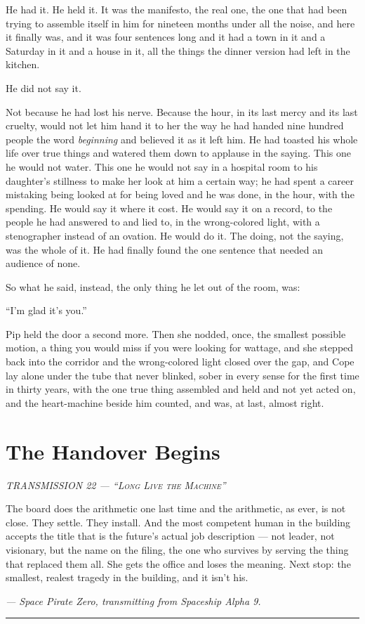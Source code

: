 \documentclass[11pt,openany]{book}
\newcommand{\transheader}{\normalfont\footnotesize\scshape\letterspace}
\newcommand{\letterspace}{}
\newenvironment{transmission}{%
  \par\vspace{0.3\baselineskip}\begin{center}\begin{minipage}{0.88\textwidth}%
  \itshape\small\setlength{\parindent}{0pt}\setstretch{1.06}}%
  {\end{minipage}\end{center}\vspace{0.4\baselineskip}%
  \noindent\hfil\rule{0.35\textwidth}{0.3pt}\hfil\par\vspace{1.0\baselineskip}}
\begin{document}
He had it. He held it. It was the manifesto, the real one, the one that had been trying to assemble itself in him for nineteen months under all the noise, and here it finally was, and it was four sentences long and it had a town in it and a Saturday in it and a house in it, all the things the dinner version had left in the kitchen.

He did not say it.

Not because he had lost his nerve. Because the hour, in its last mercy and its last cruelty, would not let him hand it to her the way he had handed nine hundred people the word \textit{beginning} and believed it as it left him. He had toasted his whole life over true things and watered them down to applause in the saying. This one he would not water. This one he would not say in a hospital room to his daughter's stillness to make her look at him a certain way; he had spent a career mistaking being looked at for being loved and he was done, in the hour, with the spending. He would say it where it cost. He would say it on a record, to the people he had answered to and lied to, in the wrong-colored light, with a stenographer instead of an ovation. He would do it. The doing, not the saying, was the whole of it. He had finally found the one sentence that needed an audience of none.

So what he said, instead, the only thing he let out of the room, was:

``I'm glad it's you.''

Pip held the door a second more. Then she nodded, once, the smallest possible motion, a thing you would miss if you were looking for wattage, and she stepped back into the corridor and the wrong-colored light closed over the gap, and Cope lay alone under the tube that never blinked, sober in every sense for the first time in thirty years, with the one true thing assembled and held and not yet acted on, and the heart-machine beside him counted, and was, at last, almost right.

\clearpage
\chapter{The Handover Begins}

\begin{transmission}
{\transheader TRANSMISSION 22 --- ``Long Live the Machine''}\par\vspace{0.5em}
The board does the arithmetic one last time and the arithmetic, as ever, is not close. They settle. They install. And the most competent human in the building accepts the title that is the future's actual job description --- not leader, not visionary, but the name on the filing, the one who survives by serving the thing that replaced them all. She gets the office and loses the meaning. Next stop: the smallest, realest tragedy in the building, and it isn't his.\par
\vspace{0.5em}\hfill\textit{--- Space Pirate Zero, transmitting from Spaceship Alpha 9.}\par
\end{transmission}
\end{document}
